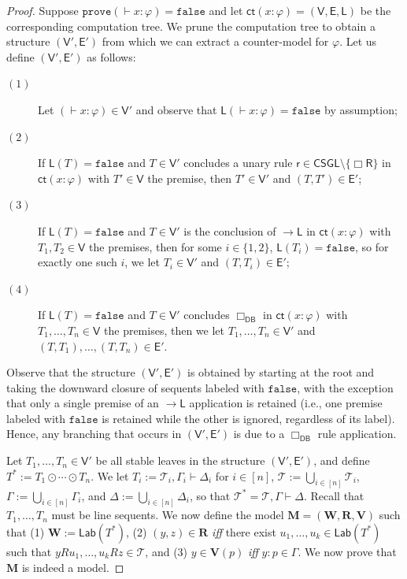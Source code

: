 \documentclass[10pt,a4paper]{amsart}
\newcommand{\M}{\mathbf{M}}
\newcommand{\R}{\mathbf{R}}
\newcommand{\V}{\mathbf{V}}
\newcommand{\W}{\mathbf{W}}
\newcommand{\boxr}{\Box\mathsf{R}}
\newcommand{\calc}{\mathsf{CSGL}}
\newcommand{\ct}{\mathsf{ct}}
\newcommand{\cte}{\mathsf{E}}
\newcommand{\ctl}{\mathsf{L}}
\newcommand{\ctv}{\mathsf{V}}
\newcommand{\false}{\mathtt{false}}
\newcommand{\fval}{\false} %
\newcommand{\iffi}{\textit{iff} }
\newcommand{\impl}{{\rightarrow}\mathsf{L}}
\newcommand{\lab}{\mathsf{Lab}}
\newcommand{\ndrule}{\Box_\mathsf{DB}}
\renewcommand{\phi}{\varphi}
\newcommand{\prove}{\mathtt{prove}}
\newcommand{\ru}{\mathsf{r}}
\newcommand{\sar}{\vdash}
\newcommand{\scomp}{\odot}
\newcommand{\set}[1]{\{#1\}}
\newcommand{\tel}{\mathcal{T}}
\newcommand{\tseq}{T} %
\begin{document}
\begin{proof} Suppose $\prove(\sar x : \phi) = \false$ and let $\ct(x : \phi) = (\ctv,\cte,\ctl)$ be the corresponding computation tree. We prune the computation tree to obtain a structure $(\ctv',\cte')$ from which we can extract a counter-model for $\phi$. Let us define $(\ctv',\cte')$ as follows:
\begin{description}

\item[$(1)$] Let $( \sar x : \phi) \in \ctv'$ and observe that $\ctl( \sar x : \phi) = \fval$ by assumption;

\item[$(2)$] If $\ctl(\tseq) = \fval$ and $\tseq \in \ctv'$ concludes a unary rule $ \ru \in \calc \setminus \set{\boxr}$ in $\ct(x : \phi)$ with $\tseq' \in \ctv$ the premise, then $\tseq' \in \ctv'$ and $(\tseq,\tseq') \in \cte'$;

\item[$(3)$] If $\ctl(\tseq) = \fval$ and $\tseq \in \ctv'$ is the conclusion of $\impl$ in $\ct(x : \phi)$ with $\tseq_{1}, \tseq_{2} \in \ctv$ the premises, then for some $i \in \set{1,2}$, $\ctl(\tseq_{i}) = \fval$, so for exactly one such $i$, we let $\tseq_{i} \in \ctv'$ and $(\tseq,\tseq_{i}) \in \cte'$;

\item[$(4)$] If $\ctl(\tseq) = \fval$ and $\tseq \in \ctv'$ concludes $\ndrule$ in $\ct(x : \phi)$ with $\tseq_{1}, \ldots, \tseq_{n} \in \ctv$ the premises, then we let $\tseq_{1}, \ldots, \tseq_{n} \in \ctv'$ and $(\tseq,\tseq_{1}), \ldots, (\tseq,\tseq_{n}) \in \cte'$.

\end{description}
Observe that the structure $(\ctv',\cte')$ is obtained by starting at the root and taking the downward closure of sequents labeled with $\false$, with the exception that only a single premise of an $\impl$ application is retained (i.e., one premise labeled with $\false$ is retained while the other is ignored, regardless of its label). Hence, any branching that occurs in $(\ctv',\cte')$ is due to a $\ndrule$ rule application.

Let $\tseq_{1}, \ldots, \tseq_{n} \in \ctv'$ be all stable leaves in the structure $(\ctv',\cte')$, and define $\tseq^{*} := \tseq_{1} \scomp \cdots \scomp \tseq_{n}$. We let $\tseq_{i} := \tel_{i}, \Gamma_{i} \sar \Delta_{i}$ for $i \in [n]$, $\tel := \bigcup_{i \in [n]} \tel_{i}$, $\Gamma := \bigcup_{i \in [n]} \Gamma_{i}$, and $\Delta := \bigcup_{i \in [n]} \Delta_{i}$, so that $\tel^{*} = \tel, \Gamma \sar \Delta$. Recall that $\tseq_{1}, \ldots, \tseq_{n}$ must be line sequents. We now define the model $\M = (\W,\R,\V)$ such that (1) $\W := \lab(\tseq^{*})$, (2) $(y,z) \in \R$ \iffi there exist $u_{1}, \ldots, u_{k} \in \lab(\tseq^{*})$ such that $yRu_{1}, \ldots, u_{k}Rz \in \tel$, and (3) $y \in \V(p)$ \iffi $y : p \in \Gamma$. We now prove that $\M$ is indeed a model. 


\end{proof}
\end{document}
